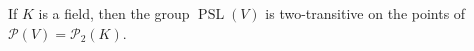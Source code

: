 If $K$ is a field, then the group $\operatorname{PSL}(V)$ is two-transitive on the points of $\mathcal{P}(V) = \mathcal{P}_2(K)$.